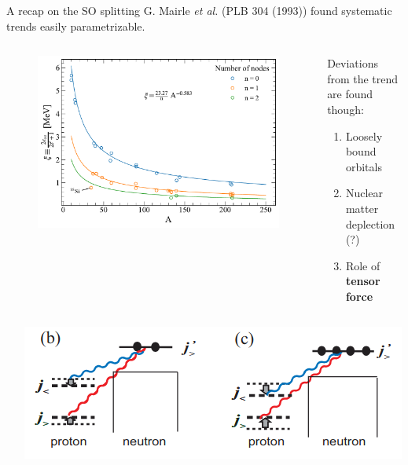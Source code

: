 \documentclass[aspectratio=43, dvipsnames]{beamer}
\newcommand{\iso}[2]{\ce{^{#1}#2}}
\begin{document}
\begin{frame}[t]{A recap on the SO splitting}
G. Mairle \textit{et al.} ({\scriptsize PLB 304 (1993)}) found systematic trends easily parametrizable.

\begin{columns}[c]
    \begin{column}{0.5\linewidth}
        \begin{figure}
            \centering
            \includegraphics[width=1\linewidth]{figures/mairle_so.pdf}
        \end{figure}
    \end{column}%
    \begin{column}{0.5\linewidth}
        Deviations from the trend are found though:
        \begin{enumerate}
            \item Loosely bound orbitals
            \item Nuclear matter deplection (\iso{35}{Si}?)
            \item Role of \textbf{tensor force}
        \end{enumerate}
    \end{column}
\end{columns}

\begin{columns}[t]
    \begin{column}{0.5\linewidth}
    \end{column}%
    \begin{column}{0.5\linewidth}
        \centering
        \includegraphics[width=0.9\linewidth]{figures/tensor_preliminary.png}
    \end{column}
\end{columns}


\end{frame}
\end{document}
